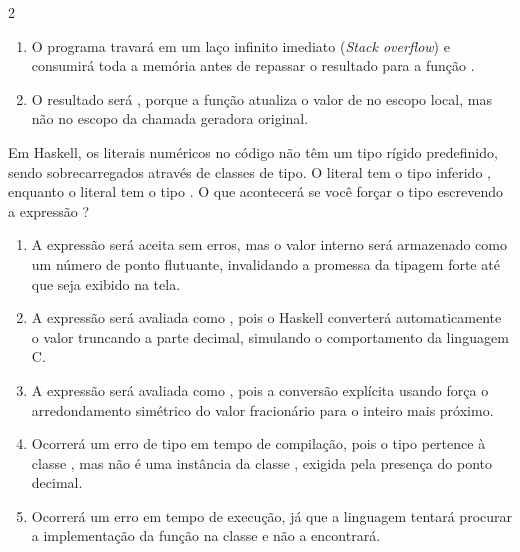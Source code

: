 \documentclass[a4paper,10pt,brazil]{article}
\begin{document}
\begin{multicols}{2}
\begin{enumerate}
  \item O programa travará em um laço infinito imediato (\emph{Stack overflow}) e consumirá toda a memória antes de repassar o resultado para a função .

  \item O resultado será \haskellinline{[10, 10, 10]}, porque a função atualiza o valor de  no escopo local, mas não no escopo da chamada geradora original.


\end{enumerate}

Em Haskell, os literais numéricos no código não têm um tipo rígido predefinido, sendo sobrecarregados através de classes de tipo. O literal  tem o tipo inferido , enquanto o literal  tem o tipo . 
O que acontecerá se você forçar o tipo escrevendo a expressão ?

\begin{enumerate}
  \item A expressão será aceita sem erros, mas o valor interno será armazenado como um número de ponto flutuante, invalidando a promessa da tipagem forte até que seja exibido na tela.

  \item A expressão será avaliada como , pois o Haskell converterá automaticamente o valor truncando a parte decimal, simulando o comportamento da linguagem C.

  \item A expressão será avaliada como , pois a conversão explícita usando \haskellinline{::} força o arredondamento simétrico do valor fracionário para o inteiro mais próximo.

  \item Ocorrerá um erro de tipo em tempo de compilação, pois o tipo  pertence à classe , mas não é uma instância da classe , exigida pela presença do ponto decimal.

  \item Ocorrerá um erro em tempo de execução, já que a linguagem tentará procurar a implementação da função  na classe  e não a encontrará.


\end{enumerate}


\end{multicols}
\end{document}
